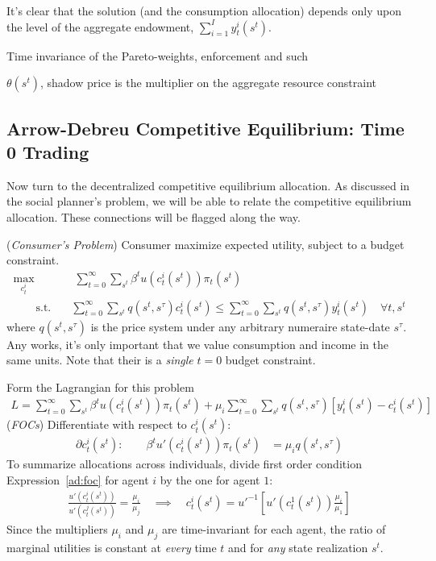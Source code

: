 \documentclass[12pt]{article}
\theoremstyle{plain}
\theoremstyle{definition}
\theoremstyle{remark}
\newcommand{\sumtinfz}{\sum^\infty_{t=0}}
\begin{document}
It's clear that the solution (and the consumption allocation) depends
only upon the level of the aggregate endowment,
$\sum_{i=1}^I y_t^i(s^t)$.

Time invariance of the Pareto-weights, enforcement and such

$\theta(s^t)$, shadow price is the multiplier on the aggregate resource constraint


\clearpage
\subsection{Arrow-Debreu Competitive Equilibrium: Time 0 Trading}

Now turn to the decentralized competitive equilibrium allocation. As
discussed in the social planner's problem, we will be able to relate the
competitive equilibrium allocation. These connections will be flagged
along the way.

(\emph{Consumer's Problem})
Consumer maximize expected utility, subject to a budget constraint.
\begin{align*}
  \max_{c_t^i}
  &
  \;
  \sumtinfz
  \sum_{s^t}
  \beta^t
  u\left(c_t^i(s^t)\right)\pi_t(s^t)
  \\
  \qquad\text{s.t.}\quad
  &
  \sumtinfz\sum_{s^t}
  q(s^t,s^\tau)c_t^i(s^t)
  \leq
  \sumtinfz\sum_{s^t}
  q(s^t,s^\tau)y_t^i(s^t)
  \quad
  \forall t,s^t
\end{align*}
where $q(s^t,s^\tau)$ is the price system under any arbitrary numeraire
state-date $s^\tau$. Any works, it's only important that we value
consumption and income in the same units.
Note that their is a \emph{single} $t=0$ budget constraint.

Form the Lagrangian for this problem
\begin{align*}
  L
  =
  \sumtinfz
  \sum_{s^t}
  \beta^t
  u\left(c_t^i(s^t)\right)\pi_t(s^t)
  +
  \mu_i
  \sumtinfz\sum_{s^t}
  q(s^t,s^\tau)[y_t^i(s^t)-c_t^i(s^t)]
\end{align*}
(\emph{FOCs})
Differentiate with respect to $c_t^i(s^t)$:
\begin{align}
  \partial c_t^i(s^t):\qquad
  \beta^t u'\left(c_t^i(s^t)\right) \pi_t(s^t)
  &= \mu_i q(s^t,s^\tau)
  \label{ad:foc}
\end{align}
To summarize allocations across individuals, divide first order
condition Expression~\ref{ad:foc} for agent $i$ by the one for agent
$1$:
\begin{align}
  \frac{u'\left(c_t^i(s^t)\right)}{u'\left(c_t^j(s^t)\right)}
  = \frac{\mu_i}{\mu_j}
  \quad\implies\quad
  c_t^i(s^t)
  =
  u'^{-1}
  \left[
  u'\left(c_t^1(s^t)\right)
  \frac{\mu_i}{\mu_1}
  \right]
  \label{ad:ratio}
\end{align}
Since the multipliers $\mu_i$ and $\mu_j$ are time-invariant for
each agent, the ratio of marginal utilities is constant at
\emph{every} time $t$ and for \emph{any} state realization $s^t$.
\end{document}
